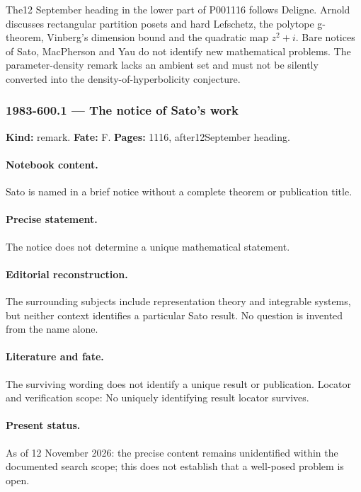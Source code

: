 The12 September heading in the lower part of P001116 follows Deligne. Arnold discusses rectangular partition posets and hard Lefschetz, the polytope g-theorem, Vinberg's dimension bound and the quadratic map \(z^2+i\). Bare notices of Sato, MacPherson and Yau do not identify new mathematical problems. The parameter-density remark lacks an ambient set and must not be silently converted into the density-of-hyperbolicity conjecture.

\subsubsection{1983-600.1 --- The notice of Sato's work}

\label{item:1983-600.1}

\noindent\textbf{Kind:} remark. \textbf{Fate:} F. \textbf{Pages:} 1116, after12September heading.\par

\paragraph{Notebook content.} Sato is named in a brief notice without a complete theorem or publication title.

\paragraph{Precise statement.} The notice does not determine a unique mathematical statement.

\paragraph{Editorial reconstruction.} The surrounding subjects include representation theory and integrable systems, but neither context identifies a particular Sato result. No question is invented from the name alone.

\paragraph{Literature and fate.} The surviving wording does not identify a unique result or publication. Locator and verification scope: No uniquely identifying result locator survives.

\paragraph{Present status.} As of 12 November 2026: the precise content remains unidentified within the documented search scope; this does not establish that a well-posed problem is open.

